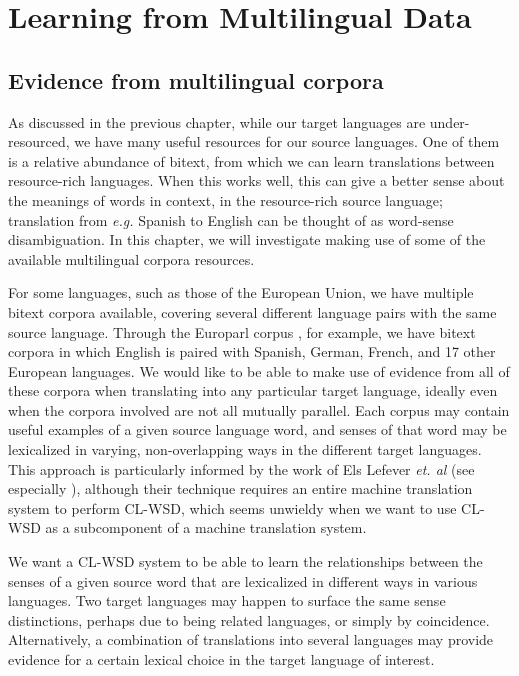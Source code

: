 \chapter{Learning from Multilingual Data}
\label{chap:multilingual}

\section{Evidence from multilingual corpora}
As discussed in the previous chapter, while our target languages are
under-resourced, we have many useful resources for our source languages. One of
them is a relative abundance of bitext, from which we can learn translations
between resource-rich languages. When this works well, this can give a better
sense about the meanings of words in context, in the resource-rich source
language; translation from \emph{e.g.} Spanish to English can be thought of as
word-sense disambiguation. In this chapter, we will investigate making use of
some of the available multilingual corpora resources.

For some languages, such as those of the European Union, we have multiple
bitext corpora available, covering several different language pairs with the
same source language. Through the Europarl corpus \cite{europarl}, for example,
we have bitext corpora in which English is paired with Spanish, German, French,
and 17 other European languages.
We would like to be able to make use of evidence from all of these corpora when
translating into any particular target language, ideally even when the corpora
involved are not all mutually parallel.
Each corpus may contain useful examples of a given source language word,
and senses of that word may be lexicalized in varying, non-overlapping ways in
the different target languages.
This approach is particularly informed by the work of Els Lefever
\emph{et. al} (see especially \cite{lefever-hoste-decock:2011:ACL-HLT2011}),
although their technique requires an entire machine translation system to
perform CL-WSD, which seems unwieldy when we want to use CL-WSD as a
subcomponent of a machine translation system.

We want a CL-WSD system to be able to learn the relationships between the
senses of a given source word that are lexicalized in different ways in various
languages.
Two target languages may happen to surface the same sense distinctions, perhaps
due to being related languages, or simply by coincidence.
Alternatively, a combination of translations into several languages may provide
evidence for a certain lexical choice in the target language of interest.


